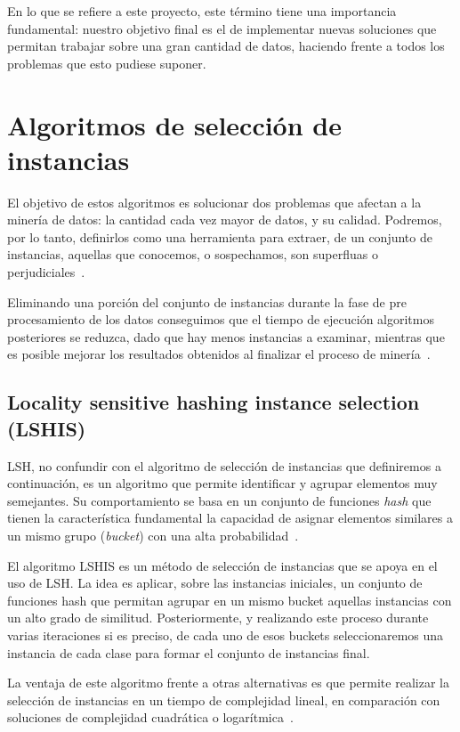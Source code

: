 En lo que se refiere a este proyecto, este término tiene una importancia fundamental: nuestro objetivo final es el de implementar nuevas soluciones que permitan trabajar sobre una gran cantidad de datos, haciendo frente a todos los problemas que esto pudiese suponer.

\section{Algoritmos de selección de instancias}\label{sec:DefAlgSel}

El objetivo de estos algoritmos es solucionar dos problemas que afectan a la minería de datos: la cantidad cada vez mayor de datos, y su calidad. Podremos, por lo tanto,  definirlos como una herramienta para extraer, de un conjunto de instancias, aquellas que conocemos, o sospechamos, son superfluas o perjudiciales~\cite{IntroInstanceSelect}.

Eliminando una porción del conjunto de instancias durante la fase de pre procesamiento de los datos conseguimos que el tiempo de ejecución algoritmos posteriores se reduzca, dado que hay menos instancias a examinar, mientras que es posible mejorar los resultados obtenidos al finalizar el proceso de minería~\cite{IntroInstanceSelect}.

\subsection{Locality sensitive hashing instance selection (LSHIS)}\label{sec:defLSHIS}

LSH, no confundir con el algoritmo de selección de instancias que definiremos a continuación, es un algoritmo que permite identificar y agrupar elementos muy semejantes. Su comportamiento se basa en un conjunto de funciones \textit{hash} que tienen la característica fundamental la capacidad de asignar elementos similares a un mismo grupo (\textit{bucket}) con una alta probabilidad~\cite{LSHISPaper}.

El algoritmo LSHIS es un método de selección de instancias que se apoya en el uso de LSH. La idea es aplicar, sobre las instancias iniciales, un conjunto de funciones hash que permitan agrupar en un mismo bucket aquellas instancias con un alto grado de similitud. Posteriormente, y realizando este proceso durante varias iteraciones si es preciso, de cada uno de esos buckets seleccionaremos una instancia de cada clase para formar el conjunto de instancias final. 

La ventaja de este algoritmo frente a otras alternativas es que permite realizar la selección de instancias en un tiempo de complejidad lineal, en comparación con soluciones de complejidad cuadrática o logarítmica~\cite{LSHISPaper}.


